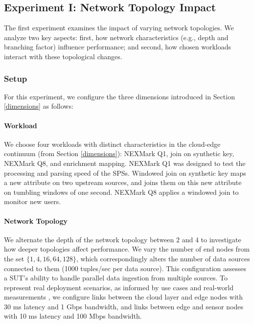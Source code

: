 \documentclass[runningheads]{llncs}
\begin{document}
\subsection{Experiment I: Network Topology Impact}
The first experiment examines the impact of varying network topologies.
We analyze two key aspects: first, how network characteristics (e.g., depth and branching factor) influence performance; and second, how chosen workloads interact with these topological changes. %
\subsubsection{Setup}
For this experiment, we configure the three dimensions introduced in Section \ref{dimensions} as follows:


\paragraph{Workload}
We choose four workloads with distinct characteristics in the cloud-edge continuum (from Section \ref{dimensions}): %
NEXMark Q1, join on synthetic key, NEXMark Q8, and enrichment mapping.
NEXMark Q1 was designed to test the processing and parsing speed of the SPSs.
Windowed join on synthetic key maps a new attribute on two upstream sources, and joins them on this new attribute on tumbling windows of one second.
NEXMark Q8 applies a windowed join to monitor new users.

\paragraph{Network Topology}
We alternate the depth of the network topology between $2$ and $4$ to investigate how deeper topologies affect performance.
We vary the number of end nodes from the set $\{1,4,16,64,128\}$, which correspondingly alters the number of data sources connected to them (1000 tuples/sec per data source).
This configuration assesses a SUT's ability to handle parallel data ingestion from multiple sources.
To represent real deployment scenarios, as informed by use cases and real-world measurements \cite{iot-edge-measures,edge-cloud-measures}, we configure links between the cloud layer and edge nodes with 30 ms latency and 1 Gbps bandwidth, and links between edge and sensor nodes with 10 ms latency and 100 Mbps bandwidth.
\end{document}
